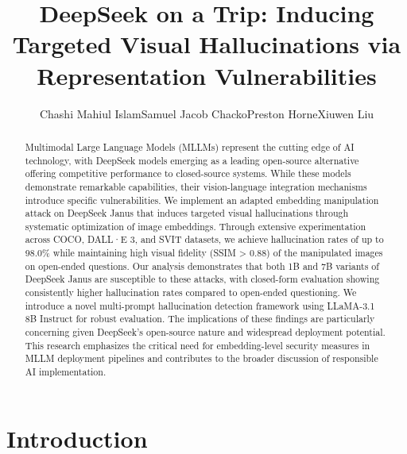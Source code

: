 \documentclass[runningheads]{llncs}
\begin{document}
\title{DeepSeek on a Trip: Inducing Targeted Visual
Hallucinations via Representation Vulnerabilities}
\author{Chashi Mahiul Islam\quad Samuel Jacob Chacko\quad Preston Horne\quad Xiuwen Liu}

\maketitle              

\begin{abstract}
Multimodal Large Language Models (MLLMs) represent the cutting edge of AI technology, with DeepSeek models emerging as a leading open-source alternative offering competitive performance to closed-source systems. While these models demonstrate remarkable capabilities, their vision-language integration mechanisms introduce specific vulnerabilities. We implement an adapted embedding manipulation attack on DeepSeek Janus that induces targeted visual hallucinations through systematic optimization of image embeddings. Through extensive experimentation across COCO, DALL·E 3, and SVIT datasets, we achieve hallucination rates of up to 98.0\% while maintaining high visual fidelity (SSIM > 0.88) of the manipulated images on open-ended questions. Our analysis demonstrates that both 1B and 7B variants of DeepSeek Janus are susceptible to these attacks, with closed-form evaluation showing consistently higher hallucination rates compared to open-ended questioning. We introduce a novel multi-prompt hallucination detection framework using LLaMA-3.1 8B Instruct for robust evaluation. The implications of these findings are particularly concerning given DeepSeek's open-source nature and widespread deployment potential. This research emphasizes the critical need for embedding-level security measures in MLLM deployment pipelines and contributes to the broader discussion of responsible AI implementation.
\end{abstract}


\section{Introduction}
\end{document}
